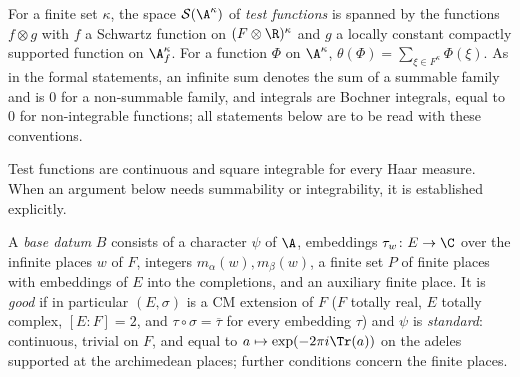 \begin{definition}\label{pf:thmK-cone:def-test}
For a finite set $\kappa$, the space $\thmKconeS(\A^\kappa)$ of \emph{test functions} is spanned by the functions
$f\otimes g$ with $f$ a Schwartz function on $(F\otimes\R)^\kappa$ and $g$ a locally constant compactly supported function
on $\A_f^\kappa$.  For a function $\Phi$ on $\A^\kappa$, $\theta(\Phi)=\sum_{\xi\in F^\kappa}\Phi(\xi)$.  As in the formal
statements, an infinite sum denotes the sum of a summable family and is $0$ for a non-summable family, and integrals are
Bochner integrals, equal to $0$ for non-integrable functions; all statements below are to be read with these
conventions.
\end{definition}

Test functions are continuous and square integrable for every Haar measure.  When an argument below needs summability
or integrability, it is established explicitly.

\begin{definition}\label{pf:thmK-cone:def-base}
A \emph{base datum} $B$ consists of a character $\psi$ of $\A$, embeddings $\tau_w\colon E\to\C$ over the infinite places
$w$ of $F$, integers $m_\alpha(w),m_\beta(w)$, a finite set $P$ of finite places with embeddings of $E$ into the
completions, and an auxiliary finite place.  It is \emph{good} if in particular $(E,\sigma)$ is a CM extension of $F$
($F$ totally real, $E$ totally complex, $[E:F]=2$, and $\tau\circ\sigma=\overline\tau$ for every embedding $\tau$) and
$\psi$ is \emph{standard}: continuous, trivial on $F$, and equal to $a\mapsto\exp(-2\pi i\Tr(a))$ on the adeles supported
at the archimedean places; further conditions concern the finite places.
\end{definition}

